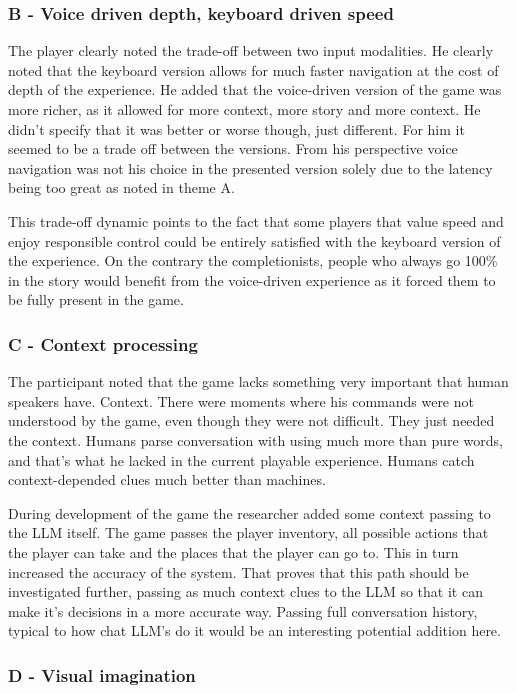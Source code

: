 \subsubsection{B - Voice driven depth, keyboard driven speed}

The player clearly noted the trade-off between two input modalities. He clearly noted that the keyboard version allows for much faster navigation at the cost of depth of the experience. He added that the voice-driven version of the game was more richer, as it allowed for more context, more story and more context. He didn't specify that it was better or worse though, just different. For him it seemed to be a trade off between the versions. From his perspective voice navigation was not his choice in the presented version solely due to the latency being too great as noted in theme A. 

This trade-off dynamic points to the fact that some players that value speed and enjoy responsible control could be entirely satisfied with the keyboard version of the experience. On the contrary the completionists, people who always go 100\% in the story would benefit from the voice-driven experience as it forced them to be fully present in the game.


\subsubsection{C - Context processing}

The participant noted that the game lacks something very important that human speakers have. Context. There were moments where his commands were not understood by the game, even though they were not difficult. They just needed the context. Humans parse conversation with using much more than pure words, and that's what he lacked in the current playable experience. Humans catch context-depended clues much better than machines. 

During development of the game the researcher added some context passing to the LLM itself. The game passes the player inventory, all possible actions that the player can take and the places that the player can go to. This in turn increased the accuracy of the system. 
That proves that this path should be investigated further, passing as much context clues to the LLM so that it can make it's decisions in a more accurate way. Passing full conversation history, typical to how chat LLM's do it would be an interesting potential addition here.


\subsubsection{D - Visual imagination}

